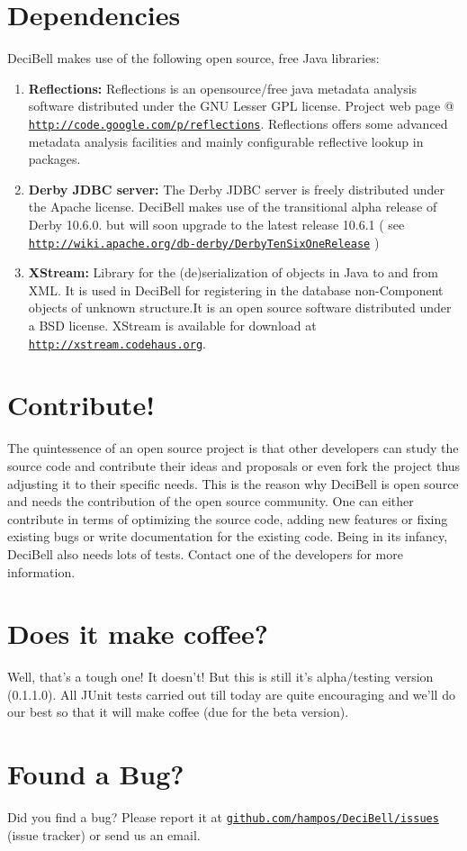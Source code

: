 \documentclass[a4paper,10pt]{article}
\begin{document}
\section*{Dependencies}
DeciBell makes use of the following open source, free Java libraries:
\begin{enumerate}
	\item \textbf{Reflections:} Reflections  is an  opensource/free java metadata  analysis software  distributed under
   	the GNU Lesser GPL license. Project web page @ \href{http://code.google.com/p/reflections}{\texttt{http://code.google.com/p/reflections}}.
	Reflections offers some advanced metadata analysis facilities and mainly configurable reflective lookup
	in packages.
	\item \textbf{Derby JDBC server:}
	The  Derby JDBC server is freely distributed  under the Apache license. DeciBell  makes
	use of the transitional alpha release of Derby 10.6.0. but will soon upgrade to the latest 
	release 10.6.1 ( see \href{http://wiki.apache.org/db-derby/DerbyTenSixOneRelease}{\texttt{http://wiki.apache.org/db-derby/DerbyTenSixOneRelease}} )
	\item \textbf{XStream:}
        Library for the (de)serialization of objects  in Java to and from  XML. It is  used in
   	DeciBell for registering in the database non-Component objects of unknown structure.It
   	is an open source software distributed under a BSD license. XStream is available for
   	download at \href{http://xstream.codehaus.org}{\texttt{http://xstream.codehaus.org}}.


\end{enumerate}

\section*{Contribute!}
The quintessence of an open source project is that other developers can study the source code and contribute
their ideas and proposals or even fork the project thus adjusting it to their specific needs. This is the
reason why DeciBell is open source and needs the contribution of the open source community. One can either 
contribute in terms of optimizing the source code, adding new features or fixing existing bugs or write
documentation for the existing code. Being in its infancy, DeciBell also needs lots of tests. Contact one of the 
developers for more information.

\section*{Does it make coffee?}\label{coffee}
Well, that's a tough one! It doesn't! But this is still it's alpha/testing version (0.1.1.0). All JUnit tests
carried out till today are quite encouraging and we'll do our best so that it will make 
coffee (due for the beta version).

\section*{Found a Bug?}\label{bug}
Did you find a bug? 
Please report it at \href{issues http://github.com/hampos/DeciBell/issues}{\texttt{github.com/hampos/DeciBell/issues}} (issue
tracker) or send us an email. 
\end{document}
